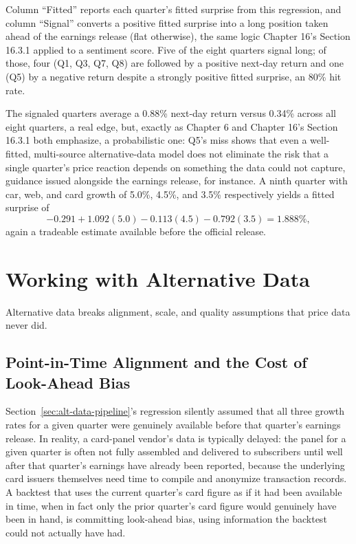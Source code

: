 \documentclass[../ai_in_finance]{subfiles}
\begin{document}
Column ``Fitted'' reports each quarter's fitted surprise from this regression, and column ``Signal'' converts a positive fitted surprise into a long position taken ahead of the earnings release (flat otherwise), the same logic Chapter 16's Section 16.3.1 applied to a sentiment score. Five of the eight quarters signal long; of those, four (Q1, Q3, Q7, Q8) are followed by a positive next-day return and one (Q5) by a negative return despite a strongly positive fitted surprise, an 80\% hit rate.

The signaled quarters average a 0.88\% next-day return versus 0.34\% across all eight quarters, a real edge, but, exactly as Chapter 6 and Chapter 16's Section 16.3.1 both emphasize, a probabilistic one: Q5's miss shows that even a well-fitted, multi-source alternative-data model does not eliminate the risk that a single quarter's price reaction depends on something the data could not capture, guidance issued alongside the earnings release, for instance. A ninth quarter with car, web, and card growth of 5.0\%, 4.5\%, and 3.5\% respectively yields a fitted surprise of
\begin{equation*}
-0.291 + 1.092(5.0) - 0.113(4.5) - 0.792(3.5) = 1.888\%,
\end{equation*}
again a tradeable estimate available before the official release.

\section{Working with Alternative Data}

Alternative data breaks alignment, scale, and quality assumptions that price data never did.

\subsection{Point-in-Time Alignment and the Cost of Look-Ahead Bias}
\label{sec:point-in-time}

Section~\ref{sec:alt-data-pipeline}'s regression silently assumed that all three growth rates for a given quarter were genuinely available before that quarter's earnings release. In reality, a card-panel vendor's data is typically delayed: the panel for a given quarter is often not fully assembled and delivered to subscribers until well after that quarter's earnings have already been reported, because the underlying card issuers themselves need time to compile and anonymize transaction records. A backtest that uses the current quarter's card figure as if it had been available in time, when in fact only the prior quarter's card figure would genuinely have been in hand, is committing look-ahead bias, using information the backtest could not actually have had.
\end{document}
